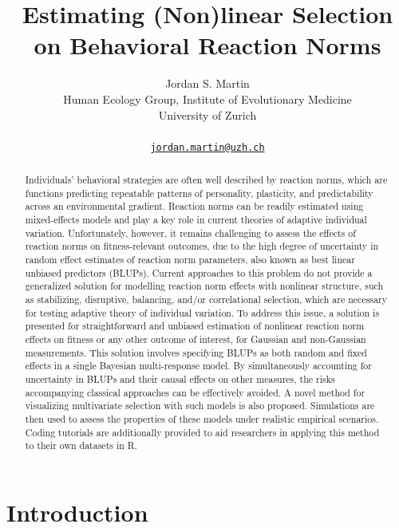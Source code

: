 \documentclass{article}
\title{Estimating (Non)linear Selection on \linebreak Behavioral
Reaction Norms}
\author{
    Jordan S. Martin
   \\
    Human Ecology Group, Institute of Evolutionary Medicine \\
    University of Zurich \\
   \\
  \texttt{\href{mailto:jordan.martin@uzh.ch}{\nolinkurl{jordan.martin@uzh.ch}}} \\
  }
\begin{document}
\maketitle

\def\tightlist{}


\begin{abstract}
Individuals' behavioral strategies are often well described by reaction
norms, which are functions predicting repeatable patterns of
personality, plasticity, and predictability across an environmental
gradient. Reaction norms can be readily estimated using mixed-effects
models and play a key role in current theories of adaptive individual
variation. Unfortunately, however, it remains challenging to assess the
effects of reaction norms on fitness-relevant outcomes, due to the high
degree of uncertainty in random effect estimates of reaction norm
parameters, also known as best linear unbiased predictors (BLUPs).
Current approaches to this problem do not provide a generalized solution
for modelling reaction norm effects with nonlinear structure, such as
stabilizing, disruptive, balancing, and/or correlational selection,
which are necessary for testing adaptive theory of individual variation.
To address this issue, a solution is presented for straightforward and
unbiased estimation of nonlinear reaction norm effects on fitness or any
other outcome of interest, for Gaussian and non-Gaussian measurements.
This solution involves specifying BLUPs as both random and fixed effects
in a single Bayesian multi-response model. By simultaneously accounting
for uncertainty in BLUPs and their causal effects on other measures, the
risks accompanying classical approaches can be effectively avoided. A
novel method for visualizing multivariate selection with such models is
also proposed. Simulations are then used to assess the properties of
these models under realistic empirical scenarios. Coding tutorials are
additionally provided to aid researchers in applying this method to
their own datasets in R.
\end{abstract}


\hypertarget{introduction}{%
\section{Introduction}\label{introduction}}
\end{document}
